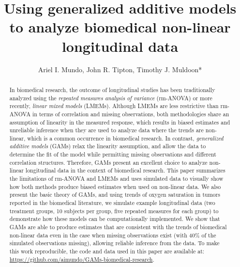 \documentclass[Royal,times,doublespace,sagev]{sagej}
\begin{document}
\title{Using generalized additive models to analyze biomedical non-linear longitudinal data}


\author{Ariel I. Mundo, John R. Tipton, Timothy J. Muldoon*}




\begin{abstract}
In biomedical research, the outcome of longitudinal studies has been traditionally analyzed using the \emph{repeated measures analysis of variance} (rm-ANOVA) or more recently, \emph{linear mixed models} (LMEMs). Although LMEMs are less restrictive than rm-ANOVA in terms of correlation and missing observations, both methodologies share an assumption of linearity in the measured response, which results in biased estimates and unreliable inference when they are used to analyze data where the trends are non-linear, which is a common occurrence in biomedical research. In contrast, \emph{generalized additive models} (GAMs) relax the linearity assumption, and allow the data to determine the fit of the model while permitting missing observations and different correlation structures. Therefore, GAMs present an excellent choice to analyze non-linear longitudinal data in the context of biomedical research. This paper summarizes the limitations of rm-ANOVA and LMEMs and uses simulated data to visually show how both methods produce biased estimates when used on non-linear data. We also present the basic theory of GAMs, and using trends of oxygen saturation in tumors reported in the biomedical literature, we simulate example longitudinal data (two treatment groups, 10 subjects per group, five repeated measures for each group) to demonstrate how these models can be computationally implemented. We show that GAMs are able to produce estimates that are consistent with the trends of biomedical non-linear data even in the case when missing observations exist (with 40\% of the simulated observations missing), allowing reliable inference from the data. To make this work reproducible, the code and data used in this paper are available at: \url{https://github.com/aimundo/GAMs-biomedical-research}.
\end{abstract}
\end{document}
